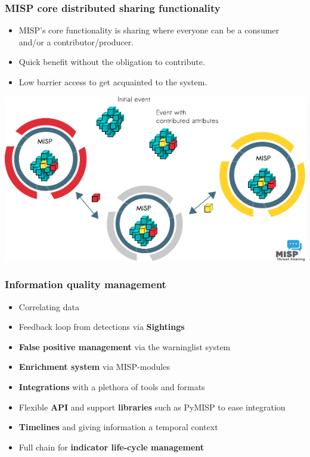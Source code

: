 \begin{frame}
\frametitle{MISP core distributed sharing functionality}
    \begin{itemize}
        \item MISP's core functionality is sharing where everyone can be a consumer and/or a contributor/producer.
        \item Quick benefit without the obligation to contribute.
        \item Low barrier access to get acquainted to the system.
    \end{itemize}
    \begin{center}
        \includegraphics[scale=0.9]{misp-distributed.pdf}
    \end{center}
\end{frame}



\begin{frame}
\frametitle{Information quality management}
    \begin{itemize}
        \item Correlating data
        \item Feedback loop from detections via {\bf Sightings}
        \item {\bf False positive management} via the warninglist system
        \item {\bf Enrichment system} via MISP-modules
        \item {\bf Integrations} with a plethora of tools and formats
        \item Flexible {\bf API} and support {\bf libraries} such as PyMISP to ease integration
        \item {\bf Timelines} and giving information a temporal context
        \item Full chain for {\bf indicator life-cycle management}
    \end{itemize}
\end{frame}



